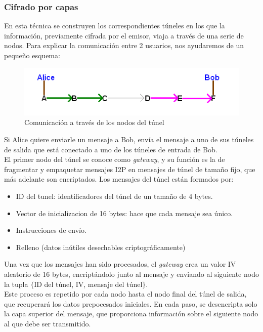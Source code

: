 \subsubsection*{Cifrado por capas}

En esta técnica se construyen los correspondientes túneles en los que la información, previamente cifrada por el emisor,  viaja a través de una serie de nodos. Para explicar la comunicación entre 2 usuarios, nos ayudaremos de un pequeño esquema: \\


	
\begin{figure}[h]
	\centering
	\includegraphics[width=.8\textwidth]{img/alice_bob_tunnel}
	\caption{Comunicación a través de los nodos del túnel}
\end{figure}

Si Alice quiere enviarle un mensaje a Bob, envía el mensaje a uno de sus túneles de salida que está conectado a uno de los túneles de entrada de Bob.\\


El primer nodo del túnel se conoce como \textit{gateway}, y su función es la de fragmentar y empaquetar mensajes I2P en mensajes de túnel de tamaño fijo, que más adelante son encriptados. 
Los mensajes del túnel están formados por:

\begin{itemize}
	\item ID del tunel: identificadores del túnel de un tamaño de 4 bytes.
	\item Vector de inicializacion de 16 bytes: hace que cada mensaje sea único.
	\item Instrucciones de envío.
	\item Relleno (datos inútiles desechables criptográficamente)
\end{itemize}

Una vez que los mensajes han sido procesados, el \textit{gateway} crea un valor IV aleatorio de 16 bytes, encriptándolo junto al mensaje y enviando al siguiente nodo la tupla $\{$ID del túnel, IV, mensaje del túnel$\}$.\\

Este proceso es repetido por cada nodo hasta el nodo final del túnel de salida, que recuperará los datos prepocesados iniciales. En cada paso, se desencripta solo la capa superior del mensaje, que proporciona información sobre el siguiente nodo al que debe ser transmitido.



